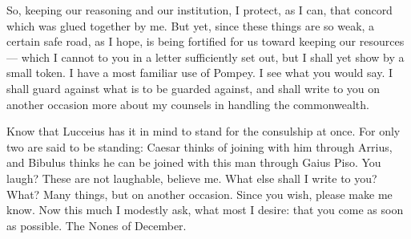  So, keeping our reasoning and our institution, I protect, as I can, that concord which was glued together by me. But yet, since these things are so weak, a certain safe road, as I hope, is being fortified for us toward keeping our resources --- which I cannot to you in a letter sufficiently set out, but I shall yet show by a small token. I have a most familiar use of Pompey. I see what you would say. I shall guard against what is to be guarded against, and shall write to you on another occasion more about my counsels in handling the commonwealth.

 Know that Lucceius has it in mind to stand for the consulship at once. For only two are said to be standing: Caesar thinks of joining with him through Arrius, and Bibulus thinks he can be joined with this man through Gaius Piso. You laugh? These are not laughable, believe me. What else shall I write to you? What? Many things, but on another occasion. Since you wish, please make me know. Now this much I modestly ask, what most I desire: that you come as soon as possible. The Nones of December.
